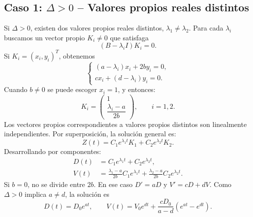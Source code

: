 \documentclass[10pt,letterpaper]{article}
\newcommand{\mat}[1]{\begin{pmatrix}#1\end{pmatrix}}
\begin{document}
\subsection{Caso 1: $\Delta>0$ -- Valores propios reales distintos}
Si $\Delta>0$, existen dos valores propios reales distintos, $\lambda_1\ne\lambda_2$. Para cada $\lambda_i$ buscamos un vector propio $K_i\ne0$ que satisfaga
\begin{equation}\label{eq:K}
(B-\lambda_iI)K_i=0.
\end{equation}
Si $K_i=(x_i,y_i)^T$, obtenemos
\begin{equation}
\begin{cases}
(a-\lambda_i)x_i+2by_i=0,\\
cx_i+(d-\lambda_i)y_i=0.
\end{cases}
\end{equation}
Cuando $b\ne0$ se puede escoger $x_i=1$, y entonces:
\begin{equation}\label{eq:eigenvec}
K_i=\mat{1\\\dfrac{\lambda_i-a}{2b}},\qquad i=1,2.
\end{equation}
Los vectores propios correspondientes a valores propios distintos son linealmente independientes. Por superposición, la solución general es:
\begin{equation}\label{eq:sol_positivo}
Z(t)=C_1e^{\lambda_1t}K_1+C_2e^{\lambda_2t}K_2.
\end{equation}
Desarrollando por componentes:
\begin{equation}\label{eq:DVpos}
\boxed{\begin{aligned}
D(t)&=C_1e^{\lambda_1t}+C_2e^{\lambda_2t},\\[2pt]
V(t)&=\frac{\lambda_1-a}{2b}C_1e^{\lambda_1t}
     +\frac{\lambda_2-a}{2b}C_2e^{\lambda_2t}.
\end{aligned}}
\end{equation}
Si $b=0$, no se divide entre $2b$. En ese caso $D'=aD$ y $V'=cD+dV$. Como $\Delta>0$ implica $a\ne d$, la solución es
\begin{equation}\label{eq:b0dif}
D(t)=D_0e^{at},\qquad
V(t)=V_0e^{dt}+\frac{cD_0}{a-d}(e^{at}-e^{dt}).
\end{equation}
\end{document}
